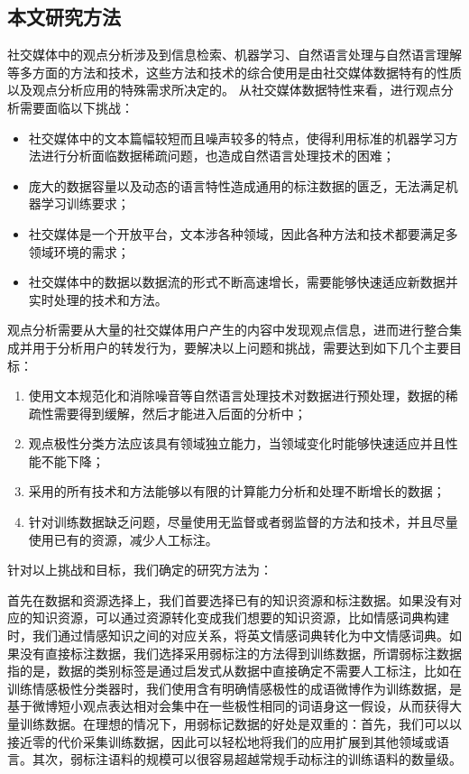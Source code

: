 \subsection{本文研究方法}
社交媒体中的观点分析涉及到信息检索、机器学习、自然语言处理与自然语言理解等多方面的方法和技术，这些方法和技术的综合使用是由社交媒体数据特有的性质以及观点分析应用的特殊需求所决定的。
从社交媒体数据特性来看，进行观点分析需要面临以下挑战：
\begin{itemize}
\item 社交媒体中的文本篇幅较短而且噪声较多的特点，使得利用标准的机器学习方法进行分析面临数据稀疏问题，也造成自然语言处理技术的困难；
\item 庞大的数据容量以及动态的语言特性造成通用的标注数据的匮乏，无法满足机器学习训练要求；
\item 社交媒体是一个开放平台，文本涉各种领域，因此各种方法和技术都要满足多领域环境的需求；
\item 社交媒体中的数据以数据流的形式不断高速增长，需要能够快速适应新数据并实时处理的技术和方法。
\end{itemize}

观点分析需要从大量的社交媒体用户产生的内容中发现观点信息，进而进行整合集成并用于分析用户的转发行为，要解决以上问题和挑战，需要达到如下几个主要目标：
\begin{enumerate}
\item 使用文本规范化和消除噪音等自然语言处理技术对数据进行预处理，数据的稀疏性需要得到缓解，然后才能进入后面的分析中；
\item 观点极性分类方法应该具有领域独立能力，当领域变化时能够快速适应并且性能不能下降；
\item 采用的所有技术和方法能够以有限的计算能力分析和处理不断增长的数据；
\item 针对训练数据缺乏问题，尽量使用无监督或者弱监督的方法和技术，并且尽量使用已有的资源，减少人工标注。
\end{enumerate}  

针对以上挑战和目标，我们确定的研究方法为：

首先在数据和资源选择上，我们首要选择已有的知识资源和标注数据。如果没有对应的知识资源，可以通过资源转化变成我们想要的知识资源，比如情感词典构建时，我们通过情感知识之间的对应关系，将英文情感词典转化为中文情感词典。如果没有直接标注数据，我们选择采用弱标注的方法得到训练数据，所谓弱标注数据指的是，数据的类别标签是通过启发式从数据中直接确定不需要人工标注，比如在训练情感极性分类器时，我们使用含有明确情感极性的成语微博作为训练数据，是基于微博短小观点表达相对会集中在一些极性相同的词语身这一假设，从而获得大量训练数据。在理想的情况下，用弱标记数据的好处是双重的：首先，我们可以以接近零的代价采集训练数据，因此可以轻松地将我们的应用扩展到其他领域或语言。其次，弱标注语料的规模可以很容易超越常规手动标注的训练语料的数量级。

